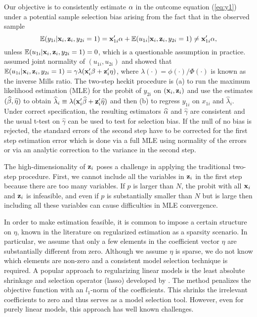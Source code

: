\documentclass[11pt]{article}
\begin{document}
Our objective is to consistently estimate $\mathbf{\alpha}$ in the outcome equation
(\ref{eq:y1}) under a potential sample selection bias arising from the fact that in the observed sample
\[\mathbb{E}(y_{1i}| \mathbf{x}_i, \mathbf{z}_i, y_{2i}=1) = \mathbf{x}_{1i}'\mathbf{\alpha} + \mathbb{E}(u_{1i}|  \mathbf{x}_i, \mathbf{z}_i, y_{2i}=1) \ne \mathbf{x}_{1i}'\mathbf{\alpha}, \]
unless $\mathbb{E}(u_{1i}|  \mathbf{x}_i, \mathbf{z}_i, y_{2i}=1)=0$, which is a questionable assumption in practice. \cite{Heckman1979} assumed joint normality of $(u_{1i}, u_{2i})$ and showed that $\mathbb{E}(u_{1i}|  \mathbf{x}_i, \mathbf{z}_i, y_{2i}=1)=\gamma \lambda(\mathbf{x}_i'\mathbf{\beta}+  \mathbf{z}_i' \mathbf{\eta})$, where $\lambda(\cdot) = \phi(\cdot)/\Phi(\cdot)$ is known as the inverse Mills ratio. The two-step heckit procedure is (a) to run the maximum likelihood estimation (MLE) for the probit of $y_{2i}$ on $(\mathbf{x}_{i}, \mathbf{z}_i)$ and use the estimates $(\widehat{\mathbf{\beta}}, \widehat{\mathbf{\eta}})$ to obtain $\widehat{\lambda}_i \equiv \lambda(\mathbf{x}_i'\widehat{\mathbf{\beta}}+  \mathbf{z}_i' \widehat{\mathbf{\eta}})$ and then (b) to regress $y_{1i}$ on $x_{1i}$ and $\hat{\lambda}_i$. Under correct specification, the resulting estimators $\widehat{\mathbf{\alpha}}$ and $\hat\gamma$ are consistent and the usual t-test on $\hat\gamma$ can be used to test for selection bias. If the null of no bias is rejected, the standard errors of the second step have to be corrected for the first step estimation error which is done via a full MLE using normality of the errors or via an analytic correction to the variance in the second step. 

The high-dimensionality of
$\mathbf{z}_i$ poses a challenge in applying the traditional two-step procedure. First, we cannot include all the variables in $\mathbf{z}_i$ in the first step because there are too many variables. If $p$ is larger than $N$, the probit with all $\mathbf{x}_i$ and $\mathbf{z}_i$ is
infeasible, and even if $p$ is substantially smaller than $N$ but is large then including all these variables can cause difficulties in MLE convergence. 

In order to make estimation feasible, it is common to impose a certain structure on $\eta$, known in the literature on regularized estimation as a sparsity scenario.  In particular, we assume that only a few elements in the coefficient vector $\eta$ are substantially different from zero. %
Although we assume $\eta$ is sparse, we do not know which elements are non-zero
and a consistent model selection technique is required.  A popular approach to regularizing linear models is the least
absolute shrinkage and selection operator (lasso) developed by
\cite{Tibshirani1996}. The method penalizes the objective function with an $l_1$-norm of the coefficients. This shrinks the irrelevant coefficients to zero and thus serves as a model selection tool. However, even for purely linear models, this approach has well known challenges.  
\end{document}
